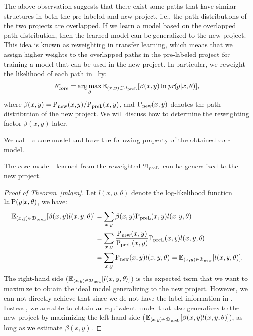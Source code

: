 \documentclass[12pt]{report}	%
\begin{document}
The above observation suggests that there 
exist some paths that have similar structures in both the pre-labeled 
and new project,
i.e., the path distributions of the two projects are overlapped.
If we learn a model based on the overlapped path distribution,
then the learned model can be generalized to the new project.
%
This idea is known as reweighting in transfer learning,
which means that we assign higher weights to the overlapped paths
in the pre-labeled project for training a model that can be used in the new project.
In particular, we reweight the likelihood of each path in \DS\ by:
%
\begin{align} \label{mltrans}
\theta_\text{core}^*
= \operatorname*{arg\,max}_{\theta} \mathbb{E}_{(x, y) \in \mathcal{D}_\text{preL}}[\beta(x, y) \ln \textit{pr} (y | x, \theta)],
\end{align}
%
where $\beta(x, y) = \text{P}_\text{new} (x, y) / \text{P}_\text{preL} (x, y)$,
and $\text{P}_\text{new}(x, y)$ denotes the path distribution of the new project.
We will discuss how to determine the reweighting factor $\beta(x, y)$ later.

We call \cm\ a core model and have the following property of the obtained core model.
%
\begin{theorem} \label{mlgen}
The core model \cm\ learned from the reweighted $\mathcal{D}_\text{preL}$ can be generalized to the new project.
\end{theorem}
%

\begin{proof}[Proof of Theorem~\ref{mlgen}]
%

Let $l(x, y, \theta)$ denote the log-likelihood function $\ln \text{P} (y | x, \theta)$, we have:
%
\begin{align} \label{mlproof}
\mathbb{E}_{(x, y) \in \mathcal{D}_\text{preL}}[\beta(x, y) l(x, y, \theta)] 
&= \sum_{x, y} \beta(x, y) \text{P}_\text{preL} (x, y) l(x, y, \theta) \nonumber \\
&= \sum_{x, y} \frac{\text{P}_\text{new} (x, y)}{\text{P}_\text{preL} (x, y)} \text{P}_\text{preL} (x, y) l(x, y, \theta) \nonumber \\
&= \sum_{x, y} \text{P}_\text{new} (x, y) l(x, y, \theta)
= \mathbb{E}_{(x, y) \in \mathcal{D}_\text{new}}[l(x, y, \theta)].
\end{align}
%
The right-hand side ($\mathbb{E}_{(x, y) \in \mathcal{D}_\text{new}}[l(x, y, \theta)]$) is the expected term that we 
want to maximize to obtain the ideal model generalizing to the new project.
However, we can not directly achieve that since we do not have the label information in \DT.
%
Instead, we are able to obtain an equivalent model that also generalizes to the new project
by maximizing the left-hand side ($\mathbb{E}_{(x, y) \in \mathcal{D}_\text{preL}}[\beta(x, y) l(x, y, \theta)]$),
as long as we estimate $\beta(x, y)$.

\end{proof}
\end{document}
